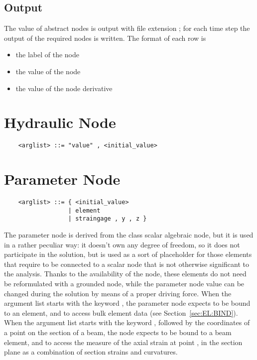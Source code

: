 \subsection{Output}
The value of abstract nodes is output with file extension ; for
each time step the output of the required nodes is written.
The format of each row is
\begin{itemize}
    \item the label of the node
    \item the value of the node
    \item the value of the node derivative
\end{itemize}



\section{Hydraulic Node}
\begin{verbatim}
    <arglist> ::= "value" , <initial_value>
\end{verbatim}



\section{Parameter Node}
\begin{verbatim}
    <arglist> ::= { <initial_value>
                  | element 
                  | straingage , y , z }
\end{verbatim}
The parameter node is derived from the class scalar algebraic node, but it
is used in a rather peculiar way: it doesn't own any degree of freedom,
so it does not participate in the solution, but is used as a sort of
placeholder for those elements that require to be connected to a scalar node
that is not otherwise significant to the analysis.
Thanks to the availability of the  node, these elements
do not need be reformulated with a grounded node, while the parameter
node value can be changed during the solution by means of a proper driving 
force.
When the argument list starts with the keyword , the parameter
node expects to be bound to an element, and to access bulk element data 
(see Section~\ref{sec:EL:BIND}).
When the argument list starts with the keyword , followed by
the coordinates of a point on the section of a beam, the 
node expects to be bound to a beam element, and to access the measure of
the axial strain at point ,  in the section plane as a
combination of section strains and curvatures.





